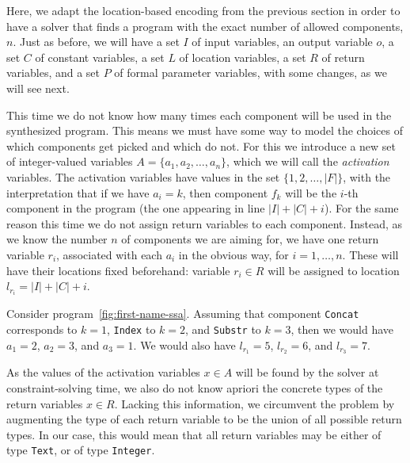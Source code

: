 Here, we adapt the location-based encoding from the previous section in order to
have a solver that finds a program with the exact number of allowed components,
$n$. 
Just as before, we will have a set $I$ of input variables, an output variable
$o$, a set $C$ of constant variables, a set $L$ of location variables, a set $R$
of return variables, and a set $P$ of formal parameter variables, with some
changes, as we will see next.

This time we do not know how many times each component will be used in the
synthesized program.
This means we must have some way to model the choices of which components get
picked and which do not.
For this we introduce a new set of integer-valued variables $A = \{a_1, a_2,
\ldots, a_n\}$, which we will call the \textit{activation} variables.
The activation variables have values in the set $\{1, 2, \ldots, |F|\}$, with
the interpretation that if we have $a_i = k$, then component $f_k$ will be the
$i$-th component in the program (the one appearing in line $|I| + |C| + i$).
For the same reason this time we do not assign return variables to each
component.
Instead, as we know the number $n$ of components we are aiming for, we have one
return variable $r_i$, associated with each $a_i$ in the obvious way, for
$i = 1, \ldots, n$.
These will have their locations fixed beforehand: variable $r_i \in R$ will be
assigned to location $l_{r_i} = |I| + |C| + i$.

\begin{example}
  Consider program~\ref{fig:first-name-ssa}.
  Assuming that component \lstinline{Concat} corresponds to $k = 1$,
  \lstinline{Index} to $k = 2$, and \lstinline{Substr} to $k = 3$, then we would
  have $a_1 = 2 $, $a_2 = 3$, and $a_3 = 1$.
  We would also have $l_{r_1} = 5$, $l_{r_2} = 6$, and $l_{r_3} = 7$.
\end{example}

As the values of the activation variables $x \in A$ will be found by the solver
at constraint-solving time, we also do not know apriori the concrete types of
the return variables $x \in R$.
Lacking this information, we circumvent the problem by augmenting the type of
each return variable to be the union of all possible return types.
In our case, this would mean that all return variables may be either of type
\lstinline{Text}, or of type \lstinline{Integer}.

